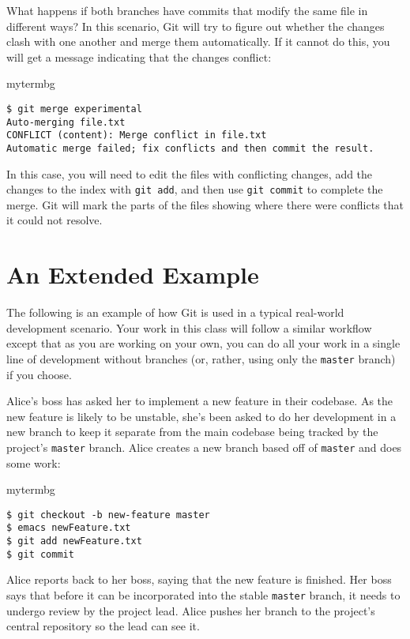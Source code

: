 What happens if both branches have commits that modify the same file in
different ways?  In this scenario, Git will try to figure out whether the
changes clash with one another and merge them automatically.  If it cannot do
this, you will get a message indicating that the changes conflict:

\begin{tsession}{mytermbg}
\begin{verbatim}
$ git merge experimental
Auto-merging file.txt
CONFLICT (content): Merge conflict in file.txt
Automatic merge failed; fix conflicts and then commit the result.
\end{verbatim}
\end{tsession}

In this case, you will need to edit the files with conflicting changes, add the
changes to the index with \texttt{git add}, and then use \texttt{git commit} to
complete the merge.  Git will mark the parts of the files showing where there
were conflicts that it could not resolve.

\section{An Extended Example}

The following is an example of how Git is used in a typical real-world
development scenario.  Your work in this class will follow a similar workflow
except that as you are working on your own, you can do all your work in a
single line of development without branches (or, rather, using only the
\texttt{master} branch) if you choose.

Alice's boss has asked her to implement a new feature in their codebase.  As
the new feature is likely to be unstable, she's been asked to do her
development in a new branch to keep it separate from the main codebase being
tracked by the project's \texttt{master} branch.  Alice creates a new branch
based off of \texttt{master} and does some work:

\begin{tsession}{mytermbg}
\begin{verbatim}
$ git checkout -b new-feature master
$ emacs newFeature.txt
$ git add newFeature.txt
$ git commit
\end{verbatim}
\end{tsession}

Alice reports back to her boss, saying that the new feature is finished.  Her
boss says that before it can be incorporated into the stable \texttt{master}
branch, it needs to undergo review by the project lead.  Alice pushes her
branch to the project's central repository so the lead can see it.

